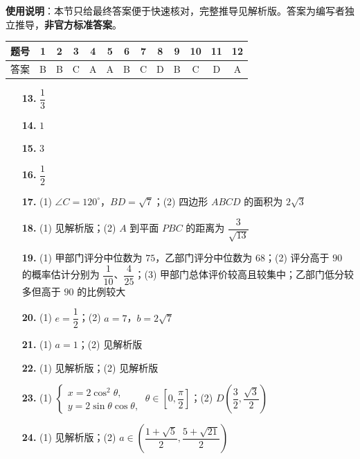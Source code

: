
\begin{gknotice}
\textbf{使用说明}：本节只给最终答案便于快速核对，完整推导见解析版。答案为编写者独立推导，\textbf{非官方标准答案}。
\end{gknotice}

\begin{center}\begin{tabular}{ccccccccccccc}
\toprule
题号 & 1 & 2 & 3 & 4 & 5 & 6 & 7 & 8 & 9 & 10 & 11 & 12 \\
\midrule
答案 & B & B & C & A & A & B & C & D & B & C & D & A \\
\bottomrule
\end{tabular}\end{center}

\begin{itemize}[leftmargin=2.6em]
  \item[\textbf{13.}] $\dfrac13$
  \item[\textbf{14.}] $1$
  \item[\textbf{15.}] $3$
  \item[\textbf{16.}] $\dfrac12$
\end{itemize}

\begin{itemize}[leftmargin=2.6em]
  \item[\textbf{17.}] (1) $\angle C=120^\circ$，$BD=\sqrt7$；(2) 四边形 $ABCD$ 的面积为 $2\sqrt3$
  \item[\textbf{18.}] (1) 见解析版；(2) $A$ 到平面 $PBC$ 的距离为 $\dfrac3{\sqrt{13}}$
  \item[\textbf{19.}] (1) 甲部门评分中位数为 $75$，乙部门评分中位数为 $68$；(2) 评分高于 $90$ 的概率估计分别为 $\dfrac1{10}$、$\dfrac4{25}$；(3) 甲部门总体评价较高且较集中；乙部门低分较多但高于 $90$ 的比例较大
  \item[\textbf{20.}] (1) $e=\dfrac12$；(2) $a=7$，$b=2\sqrt7$
  \item[\textbf{21.}] (1) $a=1$；(2) 见解析版
  \item[\textbf{22.}] (1) 见解析版；(2) 见解析版
  \item[\textbf{23.}] (1) $\begin{cases}x=2\cos^2\theta,\\y=2\sin\theta\cos\theta,\end{cases}\ \theta\in\left[0,\dfrac\pi2\right]$；(2) $D\left(\dfrac32,\dfrac{\sqrt3}{2}\right)$
  \item[\textbf{24.}] (1) 见解析版；(2) $a\in\left(\dfrac{1+\sqrt5}{2},\dfrac{5+\sqrt{21}}2\right)$
\end{itemize}
